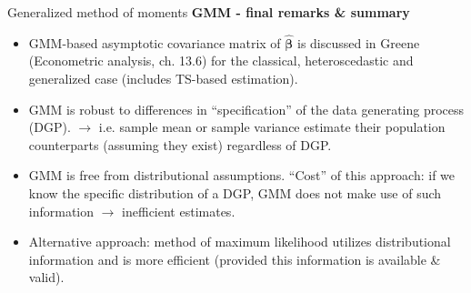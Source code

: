 \documentclass{beamer}
\begin{document}
\begin{frame}{Generalized method of moments}
\textbf{GMM - final remarks \& summary}\\
\begin{itemize}
\item GMM-based asymptotic covariance matrix of $\hat{\bm{\beta}}$ is discussed in Greene (Econometric analysis, ch. 13.6) for the classical, heteroscedastic and generalized case (includes TS-based estimation).
\medskip
\item GMM is robust to differences in ``specification'' of the data generating process (DGP). $\rightarrow$ i.e. sample mean or sample variance estimate their population counterparts (assuming they exist) regardless of DGP.
\medskip
\item GMM is free from distributional assumptions. ``Cost'' of this approach: if we know the specific distribution of a DGP, GMM does not make use of such information $\rightarrow$ inefficient estimates.
\medskip 
\item Alternative approach: method of maximum likelihood utilizes distributional information and is more efficient (provided this information is available \& valid).
\end{itemize}
\end{frame}
\end{document}
